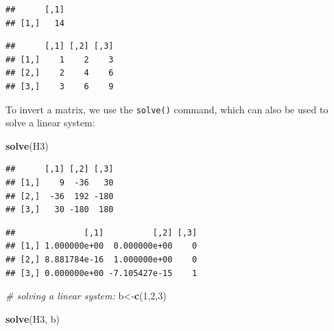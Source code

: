 \documentclass[]{article}
\newenvironment{Shaded}{\begin{snugshade}}{\end{snugshade}}
\newcommand{\KeywordTok}[1]{\textcolor[rgb]{0.13,0.29,0.53}{\textbf{#1}}}
\newcommand{\DataTypeTok}[1]{\textcolor[rgb]{0.13,0.29,0.53}{#1}}
\newcommand{\DecValTok}[1]{\textcolor[rgb]{0.00,0.00,0.81}{#1}}
\newcommand{\CommentTok}[1]{\textcolor[rgb]{0.56,0.35,0.01}{\textit{#1}}}
\newcommand{\OperatorTok}[1]{\textcolor[rgb]{0.81,0.36,0.00}{\textbf{#1}}}
\newcommand{\NormalTok}[1]{#1}
\begin{document}
\begin{verbatim}
##      [,1]
## [1,]   14
\end{verbatim}

\begin{Shaded}
\end{Shaded}

\begin{verbatim}
##      [,1] [,2] [,3]
## [1,]    1    2    3
## [2,]    2    4    6
## [3,]    3    6    9
\end{verbatim}

To invert a matrix, we use the \texttt{solve()} command, which can also
be used to solve a linear system:

\begin{Shaded}
\begin{Highlighting}[]
\KeywordTok{solve}\NormalTok{(H3)}
\end{Highlighting}
\end{Shaded}

\begin{verbatim}
##      [,1] [,2] [,3]
## [1,]    9  -36   30
## [2,]  -36  192 -180
## [3,]   30 -180  180
\end{verbatim}

\begin{Shaded}
\end{Shaded}

\begin{verbatim}
##              [,1]          [,2] [,3]
## [1,] 1.000000e+00  0.000000e+00    0
## [2,] 8.881784e-16  1.000000e+00    0
## [3,] 0.000000e+00 -7.105427e-15    1
\end{verbatim}

\begin{Shaded}
\begin{Highlighting}[]
\CommentTok{# solving a linear system:}
\NormalTok{b<-}\KeywordTok{c}\NormalTok{(}\DecValTok{1}\NormalTok{,}\DecValTok{2}\NormalTok{,}\DecValTok{3}\NormalTok{)}

\KeywordTok{solve}\NormalTok{(H3, b)}
\end{Highlighting}
\end{Shaded}
\end{document}
